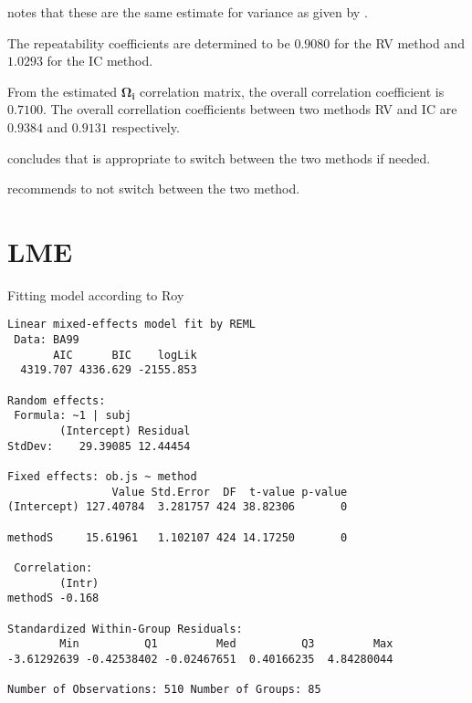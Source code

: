 \documentclass[12pt, a4paper]{article}
\theoremstyle{plain}
\theoremstyle{definition}
\theoremstyle{remark}
\begin{document}
\citet{roy} notes that these are the same estimate for variance as given by \citet{BA99}.


The repeatability coefficients are determined to be $0.9080$ for the RV method and $1.0293$ for the IC method.

From the estimated $\boldsymbol{\Omega_{i}}$ correlation matrix, the overall correlation coefficient is $0.7100$.
The overall correllation coefficients between two methods RV and IC are $0.9384$ and $0.9131$ respectively.

\citet{roy} concludes that is appropriate to switch between the two methods if needed.


\citet{haber}

\citet{roy} recommends to not switch between the two method.

\section{LME}

Fitting model according to Roy

\newpage
\begin{verbatim}
Linear mixed-effects model fit by REML
 Data: BA99
       AIC      BIC    logLik
  4319.707 4336.629 -2155.853

Random effects:
 Formula: ~1 | subj
        (Intercept) Residual
StdDev:    29.39085 12.44454

Fixed effects: ob.js ~ method
                Value Std.Error  DF  t-value p-value
(Intercept) 127.40784  3.281757 424 38.82306       0

methodS     15.61961   1.102107 424 14.17250       0

 Correlation:
        (Intr)
methodS -0.168

Standardized Within-Group Residuals:
        Min          Q1         Med          Q3         Max
-3.61292639 -0.42538402 -0.02467651  0.40166235  4.84280044

Number of Observations: 510 Number of Groups: 85

\end{verbatim}

\newpage

\end{document}
